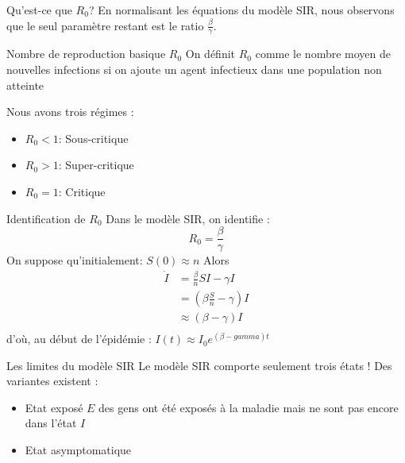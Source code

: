 \documentclass[10pt]{beamer}
\begin{document}
\begin{frame}{Qu'est-ce que $R_0$?}
  En normalisant les équations du modèle SIR, nous observons que le seul
  paramètre restant est le ratio $\frac{\beta}{\gamma}$.

  \begin{block}{Nombre de reproduction basique $R_0$}
   On définit $R_0$ comme le nombre moyen de nouvelles infections si on
   ajoute un agent infectieux dans une population non atteinte
  \end{block}

  Nous avons trois régimes :
  \begin{itemize}
    \item $R_0 < 1$: Sous-critique
    \item $R_0 > 1$: Super-critique
    \item $R_0 = 1$: Critique
  \end{itemize}
\end{frame}

\begin{frame}{Identification de $R_0$}
  Dans le modèle SIR, on identifie :
  \begin{equation}
    R_0 = \frac{\beta}{\gamma}
  \end{equation}
  On suppose qu'initialement: $S(0) \approx n$ Alors
  \begin{equation}
    \begin{aligned}
      \dot{I} &= \frac{\beta}{n} S I - \gamma I  \\
              &= (\beta \frac{S}{n} - \gamma) I \\
              &\approx (\beta  - \gamma) I \\
    \end{aligned}
  \end{equation}
  d'où, au début de l'épidémie : $I(t) \approx I_0 e^{(\beta - gamma)t}$

\end{frame}

\begin{frame}{Les limites du modèle SIR}
  Le modèle SIR comporte seulement trois états ! Des variantes existent :
  \begin{itemize}
    \item Etat exposé $E$ des gens ont été exposés à la maladie mais ne sont pas
      encore dans l'état $I$
    \item Etat asymptomatique
  \end{itemize}
\end{frame}
\end{document}
